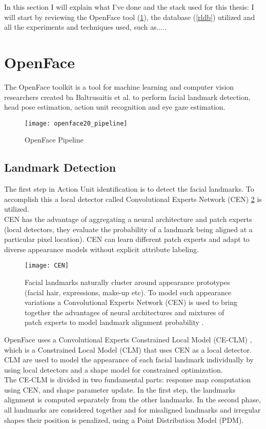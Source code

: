 In this section I will explain what I've done and the stack used for this thesis: I will start by reviewing the OpenFace tool (\ref{OpenFace}), the database (\ref{rldb}) utilized and all the experiments and techniques used, such as.....



\section{OpenFace} \label{OpenFace}
The OpenFace \cite{Baltru2018} toolkit is a tool for machine learning and computer vision researchers created ba Baltrusaitis et al. to perform facial landmark detection, head pose estimation, action unit recognition and eye gaze estimation.

\begin{figure}[H]
	\centering
	\texttt{[image: openface20\_pipeline]}
	\caption{OpenFace Pipeline \cite{Baltru2018}}
	\label{fig:openface20_pipeline}
\end{figure}

\subsection{Landmark Detection}
The first step in Action Unit identification is to detect the facial landmarks. To accomplish this a local detector called Convolutional Experts Network (CEN) \ref{fig:CEN} is utilized. \\CEN has the advantage of aggregating a neural architecture and patch experts (local detectors, they evaluate the probability of a landmark being aligned at a particular pixel location). CEN can learn different patch experts and adapt to diverse appearance models without explicit attribute labeling.

\begin{figure}[H]
	\centering
	\texttt{[image: CEN]}
	\caption{Facial landmarks naturally cluster around appearance prototypes (facial hair, expressions, make-up etc). To model such appearance variations a Convolutional Experts Network (CEN) is used to bring together the advantages of neural architectures and mixtures of patch experts to model landmark alignment probability \cite{Baltru2017}.}
	\label{fig:CEN}
\end{figure}

OpenFace uses a Convolutional Experts Constrained Local Model (CE-CLM) \cite{Baltru2017}, which is a Constrained Local Model (CLM) that uses CEN as a local detector. CLM are used to model the appearance of each facial landmark individually by using local detectors and a shape model for constrained optimization. \\
The CE-CLM is divided in two fundamental parts: response map computation using CEN, and shape parameter update. In the first step, the landmarks alignment is computed separately from the other landmarks. In the second phase, all landmarks are considered together and for misaligned landmarks and irregular shapes their position is penalized, using a Point Distribution Model (PDM).

